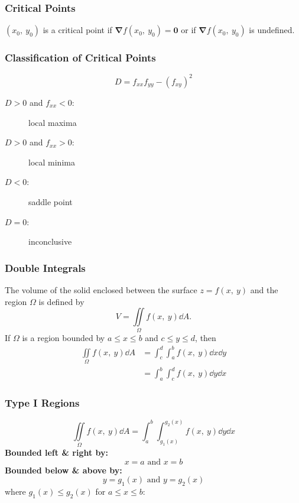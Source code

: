 \documentclass{article}
\begin{document}
\begin{multicols}{3}
    \subsubsection*{Critical Points}
    $(x_0,\: y_0)$ is a critical point if $\symbf{\nabla}f(x_0,\: y_0) = \symbf{0}$
    or if $\symbf{\nabla}f(x_0,\: y_0)$ is undefined.
    \subsubsection*{Classification of Critical Points}
    \begin{equation*}
        D = f_{xx}f_{yy} - \left( f_{xy} \right)^2
    \end{equation*}
    \begin{description}
        \item[$D > 0$ and $f_{xx} < 0$:] local maxima
        \item[$D > 0$ and $f_{xx} > 0$:] local minima
        \item[$D < 0$:] saddle point
        \item[$D = 0$:] inconclusive
    \end{description}
    \subsubsection*{Double Integrals}
    The volume of the solid
    enclosed between the surface $z=f(x,\: y)$ and the region $\Omega$ is
    defined by
    \begin{equation*}
        V = \iint\limits_{\Omega} f(x,\: y) \dd{A}.
    \end{equation*}
    If $\Omega$ is a region bounded by $a \leq x \leq b$ and $c \leq y \leq d$, then
    \begin{align*}
        \iint\limits_{\Omega} f(x,\: y) \dd{A} & = \int_c^d\int_a^b f(x,\: y) \dd{x} \dd{y} \\
                                               & = \int_a^b\int_c^d f(x,\: y) \dd{y} \dd{x}
    \end{align*}
    \subsubsection*{Type I Regions}
    \begin{equation*}
        \iint\limits_{\Omega} f(x,\: y) \dd{A} = \int_a^b\int_{g_1(x)}^{g_2(x)} f(x,\: y) \dd{y} \dd{x}
    \end{equation*}
    \textbf{Bounded left \& right by:}
    \begin{equation*}
        x=a \text{ and } x=b
    \end{equation*}
    \textbf{Bounded below \& above by:}
    \begin{equation*}
        y=g_1(x) \text{ and } y=g_2(x)
    \end{equation*}
    where $g_1(x) \leq g_2(x)$ for $a \leq x \leq b$:

\end{multicols}
\end{document}

